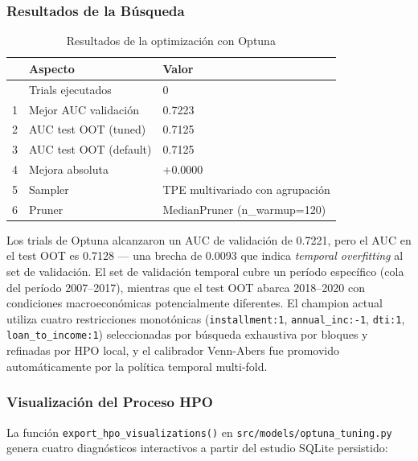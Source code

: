 \documentclass[
  spanish,
  11pt,
  letterpaper,
]{scrbook}
\theoremstyle{plain}
\theoremstyle{remark}
\begin{document}
\subsubsection{Resultados de la
Búsqueda}\label{resultados-de-la-buxfasqueda}

{

\begin{longtable}[]{@{}lll@{}}

\caption{\label{tbl-optuna-results}Resultados de la optimización con
Optuna}

\tabularnewline

\toprule\noalign{}
& Aspecto & Valor \\
\midrule\noalign{}
\endhead
\bottomrule\noalign{}
\endlastfoot
0 & Trials ejecutados & 0 \\
1 & Mejor AUC validación & 0.7223 \\
2 & AUC test OOT (tuned) & 0.7125 \\
3 & AUC test OOT (default) & 0.7125 \\
4 & Mejora absoluta & +0.0000 \\
5 & Sampler & TPE multivariado con agrupación \\
6 & Pruner & MedianPruner (n\_warmup=120) \\

\end{longtable}

}

Los trials de Optuna alcanzaron un AUC de validación de 0.7221, pero el
AUC en el test OOT es 0.7128 --- una brecha de 0.0093 que indica
\emph{temporal overfitting} al set de validación. El set de validación
temporal cubre un período específico (cola del período 2007--2017),
mientras que el test OOT abarca 2018--2020 con condiciones
macroeconómicas potencialmente diferentes. El champion actual utiliza
cuatro restricciones monotónicas (\texttt{installment:1},
\texttt{annual\_inc:-1}, \texttt{dti:1}, \texttt{loan\_to\_income:1})
seleccionadas por búsqueda exhaustiva por bloques y refinadas por HPO
local, y el calibrador Venn-Abers fue promovido automáticamente por la
política temporal multi-fold.

\subsubsection{Visualización del Proceso
HPO}\label{visualizaciuxf3n-del-proceso-hpo}

La función \texttt{export\_hpo\_visualizations()} en
\texttt{src/models/optuna\_tuning.py} genera cuatro diagnósticos
interactivos a partir del estudio SQLite persistido:
\end{document}
